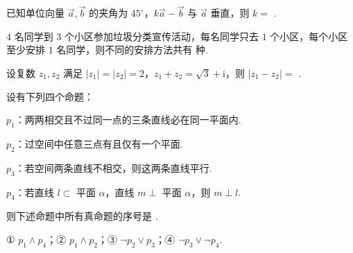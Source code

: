 \documentclass[a4paper,11pt]{report}
\begin{document}
\begin{examquestions}[start=13]

\item 已知单位向量 $\vec a,\vec b$ 的夹角为 $45^\circ$，$k\vec a-\vec b$ 与 $\vec a$ 垂直，则 $k=$ \blank.

\item $4$ 名同学到 $3$ 个小区参加垃圾分类宣传活动，每名同学只去 $1$ 个小区，每个小区至少安排 $1$ 名同学，则不同的安排方法共有 \blank 种.

\item 设复数 $z_1,z_2$ 满足 $|z_1|=|z_2|=2$，$z_1+z_2=\sqrt3+\mathrm{i}$，则 $|z_1-z_2|=$ \blank.

\item 设有下列四个命题：

$p_1$：两两相交且不过同一点的三条直线必在同一平面内. 

$p_2$：过空间中任意三点有且仅有一个平面. 

$p_3$：若空间两条直线不相交，则这两条直线平行. 

$p_4$：若直线 $l\subset$ 平面 $\alpha$，直线 $m\perp$ 平面 $\alpha$，则 $m\perp l$. 

则下述命题中所有真命题的序号是 \blank.

① $p_1\wedge p_4$；② $p_1\wedge p_2$；③ $\neg p_2\vee p_3$；④ $\neg p_3\vee\neg p_4$.
\end{examquestions}
\end{document}
